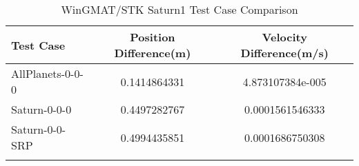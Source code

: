 \begin{table}[htbp!]
\centering
\caption{ WinGMAT/STK Saturn1 Test Case Comparison}
      \begin{tabular}{lcc}
      \hline\hline
          Test Case & Position Difference(m) & Velocity Difference(m/s) \\
         \hline
         AllPlanets-0-0-0 & 0.1414864331 & 4.873107384e-005 \\
         Saturn-0-0-0 & 0.4497282767 & 0.0001561546333 \\
         Saturn-0-0-SRP & 0.4994435851 & 0.0001686750308 \\
      \hline\hline
      \label{Table: Saturn1 WinGMAT-STK Table} 
\end{tabular}
\end{table}
